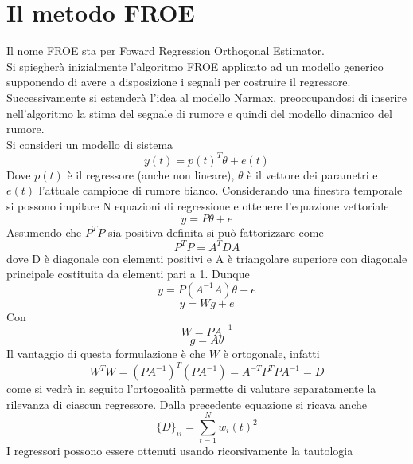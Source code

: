 \documentclass[10pt,a4paper]{book}
\author{Giorgio Mirenda}
\begin{document}
\chapter{Il metodo FROE}
Il nome FROE sta per Foward Regression Orthogonal Estimator.\\
Si spiegherà inizialmente l'algoritmo FROE applicato ad un modello generico supponendo di avere a disposizione i segnali per costruire il regressore. Successivamente si estenderà l'idea al modello Narmax, preoccupandosi di inserire nell'algoritmo la stima del segnale di rumore e quindi del modello dinamico del rumore.\\
Si consideri un modello di sistema
\begin{equation}
y(t)=p(t)^T \theta +e(t)
\end{equation}
Dove $p(t)$ è il regressore (anche non lineare), $\theta$ è il vettore dei parametri e $e(t)$ l'attuale campione di rumore bianco.
Considerando una finestra temporale si possono impilare N equazioni di regressione
e ottenere l'equazione vettoriale
\begin{equation}
y=P\theta +e
\end{equation}
Assumendo che $P^TP$ sia positiva definita 
si può fattorizzare come
\begin{equation}
P^TP=A^TDA
\end{equation}
dove D è diagonale con elementi positivi e A è triangolare superiore con diagonale principale costituita da elementi pari a 1.
Dunque
\begin{equation}
y=P(A^{-1}A)\theta +e
\end{equation}
\begin{equation}
y=Wg+e
\end{equation}
Con
\begin{equation}
W=PA^{-1} \label{wdef}
\end{equation}
\begin{equation}
g=A\theta
\end{equation}
Il vantaggio di questa formulazione è che $W$ è ortogonale, infatti
\begin{equation}
W^TW=(PA^{-1})^T(PA^{-1})=A^{-T}P^{T}PA^{-1}=D \label{ort}
\end{equation}
come si vedrà in seguito l'ortogoalità permette di valutare separatamente la rilevanza di ciascun regressore.
Dalla precedente equazione si ricava anche
\begin{equation}
\{D\}_{ii}=\sum_{t=1}^N w_i(t)^2
\end{equation}
I regressori possono essere ottenuti usando ricorsivamente la tautologia
\end{document}
